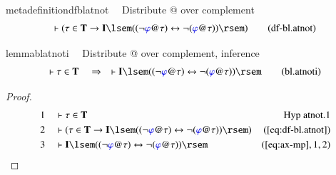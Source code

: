 \begin{restatable}{metadefinition}{dfblatnot}~~ Distribute @ over complement
\begin{align}
\vdash ( \tau \in \mathbf{T} \rightarrow \mathbf{I} \lsem ( ( \lnot
    \mw{\varphi} @ \tau ) \leftrightarrow \lnot ( \mw{\varphi} @ \tau ) ) \rsem
    )\label{eq:df-bl.atnot}\tag{df-bl.atnot}
\end{align}
\end{restatable}

\begin{restatable}{lemma}{blatnoti}~~ Distribute @ over complement, inference
\begin{align}
\vdash \tau \in \mathbf{T}\quad\Rightarrow\quad \vdash \mathbf{I} \lsem ( (
    \lnot \mw{\varphi} @ \tau ) \leftrightarrow \lnot ( \mw{\varphi} @ \tau ) )
    \rsem\label{eq:bl.atnoti}\tag{bl.atnoti}
\end{align}
\end{restatable}

\begin{proof}
\begin{align}
  1 &&  & \vdash \tau \in \mathbf{T}&\text{Hyp~atnot.1}\notag%
  \\ 2 &&  & \vdash ( \tau \in \mathbf{T} \rightarrow \mathbf{I} \lsem ( (
      \lnot \mw{\varphi} @ \tau ) \leftrightarrow \lnot (
      \mw{\varphi} @ \tau ) ) \rsem
      )&(\mbox{\ref{eq:df-bl.atnot}})\notag
  \\ 3 &&  & \vdash \mathbf{I} \lsem ( ( \lnot \mw{\varphi} @ \tau )
      \leftrightarrow \lnot ( \mw{\varphi} @ \tau ) )
      \rsem&(\mbox{\ref{eq:ax-mp}},1,2)\notag
\end{align}
\end{proof}

